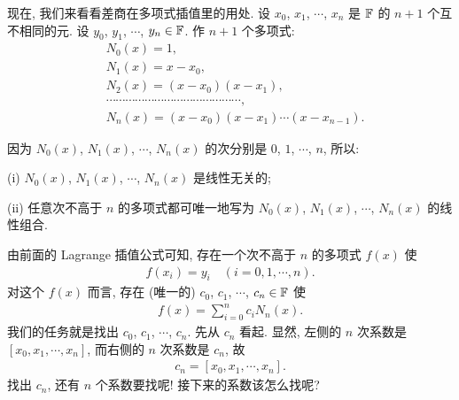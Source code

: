 现在, 我们来看看差商在多项式插值里的用处. 设 $x_0$, $x_1$, $\cdots$, $x_{n}$ 是 $\mathbb{F}$ 的 $n+1$ 个互不相同的元. 设 $y_0$, $y_1$, $\cdots$, $y_{n} \in \mathbb{F}$. 作 $n+1$ 个多项式:
\begin{align*}
     & N_0 (x) = 1,                                          \\
     & N_1 (x) = x - x_0,                                    \\
     & N_2 (x) = (x - x_0) (x - x_1),                        \\
     & \cdots \cdots \cdots \cdots \cdots \cdots \cdots
    \cdots \cdots \cdots \cdots \cdots \cdots \cdots,        \\
     & N_{n} (x) = (x - x_0) (x - x_1) \cdots (x - x_{n-1}).
\end{align*}

因为 $N_0 (x)$, $N_1 (x)$, $\cdots$, $N_n (x)$ 的次分别是 $0$, $1$, $\cdots$, $n$, 所以:

(i) $N_0 (x)$, $N_1 (x)$, $\cdots$, $N_n (x)$ 是线性无关的;

(ii) 任意次不高于 $n$ 的多项式都可唯一地写为 $N_0 (x)$, $N_1 (x)$, $\cdots$, $N_n (x)$ 的线性组合.

由前面的 Lagrange 插值公式可知, 存在一个次不高于 $n$ 的多项式 $f(x)$ 使
\begin{align*}
    f(x_i) = y_i \quad (i = 0,1,\cdots,n).
\end{align*}
对这个 $f(x)$ 而言, 存在 (唯一的) $c_0$, $c_1$, $\cdots$, $c_n \in \mathbb{F}$ 使
\begin{align*}
    f(x) = \sum_{i = 0}^{n} c_i N_{n} (x).
\end{align*}
我们的任务就是找出 $c_0$, $c_1$, $\cdots$, $c_n$. 先从 $c_n$ 看起. 显然, 左侧的 $n$ 次系数是 $[x_0, x_1, \cdots, x_n]$, 而右侧的 $n$ 次系数是 $c_n$, 故
\begin{align*}
    c_n = [x_0, x_1, \cdots, x_n].
\end{align*}
找出 $c_n$, 还有 $n$ 个系数要找呢! 接下来的系数该怎么找呢?

